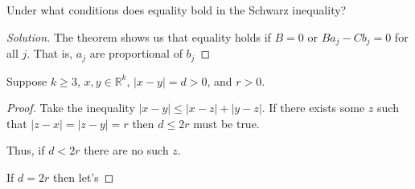 \begin{prblm}
	Under what conditions does equality bold in the Schwarz inequality?
	\begin{proof}[Solution]
		The theorem shows us that equality holds if $B = 0$
		or $Ba_j - Cb_j = 0$ for all $j$. That is, $a_j$ are proportional of $b_j$
	\end{proof}
\end{prblm}

\begin{prblm}
	Suppose $k \geq 3$, $x, y \in \mathbb{R}^k$, $|x-y| = d > 0$, and $r > 0$.
	\begin{proof}
		Take the inequality $|x-y| \leq |x-z| + |y-z|$.
		If there exists some $z$ such that $|z-x| = |z-y| = r$ then $d \leq 2r$ must be true.

		Thus, if $d < 2r$ there are no such $z$.

		If $d = 2r$ then let's
	\end{proof}
\end{prblm}

